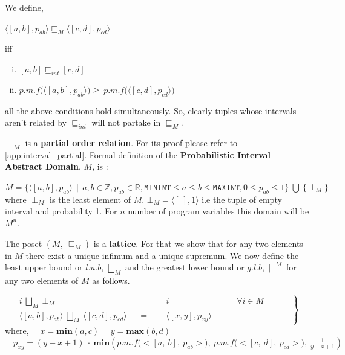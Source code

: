 \documentclass[final,3p, review, times]{util/elsarticle}
\begin{document}
We define,

\centerline{$\langle[a,b],p_{ab}\rangle\sqsubseteq_M\langle[c,d],p_{cd}\rangle$}
iff
\begin{enumerate}[i)]
\item $[a,b]\sqsubseteq_{int}[c,d]$
\item $p.m.f\Big(\langle[a,b],p_{ab}\rangle\Big)\geq\ p.m.f\Big(\langle[c,d],p_{cd}\rangle\Big)$
\end{enumerate}
all the above conditions hold simultaneously. So, clearly tuples whose intervals aren't related by $\sqsubseteq_{int}$ will not partake in $\sqsubseteq_M$.

$\sqsubseteq_M$ is a \textbf{partial order relation}. For its proof please refer to \ref{app:interval_partial}. Formal definition of the \textbf{Probabilistic Interval Abstract Domain}, $M$, is :

$M=\big\{\langle[a,b],p_{ab}\rangle\ \ |\ \ a,b\in\mathbb{Z}, p_{ab}\in\mathbb{R}, \mathtt{MININT}\leq a\leq b\leq\mathtt{MAXINT}, 0\leq p_{ab}\leq1\big\}\ \bigcup\ \big\{\perp_M\big\}$\\
where $\perp_M$ is the least element of $M$. $\bot_M=\langle[\ ],1\rangle$ i.e the tuple of empty interval and probability 1. For $n$ number of program variables this domain will be $M^n$.

The poset $(M,\ \sqsubseteq_M)$ is a \textbf{lattice}. For that we show that for any two elements in $M$ there exist a unique infimum and a unique supremum. We now define the least upper bound or $l.u.b$, $\displaystyle\bigsqcup_M$ and the greatest lower bound or $g.l.b$, $\displaystyle\bigsqcap^M$ for any two elements of $M$ as follows.

\begin{equation}
\label{eq:lub_M}
 \left.\begin{aligned}
        i\ \bigsqcup_M\ \bot_M&&=&\quad\ \ i\qquad\qquad\qquad\qquad\text{$\forall i\in M$}\\
        \langle[a,b],p_{ab}\rangle\ \bigsqcup_M\ \langle[c,d],p_{cd}\rangle&&=&\quad\ \ \langle[x,y],p_{xy}\rangle\qquad\quad\qquad\qquad
       \end{aligned}\qquad
 \right\}
\end{equation}
where,
	$\quad x=\mathbf{min}(a,c)$
	$\quad y=\mathbf{max}(b,d)$
	$\quad\displaystyle p_{xy}=(y-x+1)\ \cdot\ \mathbf{min}\left(p.m.f\Big(\big<[a,\ b],\ p_{ab}\big>\Big),\ p.m.f\Big(\big<[c,\ d],\ p_{cd}\big>\Big),\ \frac{1}{y-x+1}\right)$
	
\end{document}
